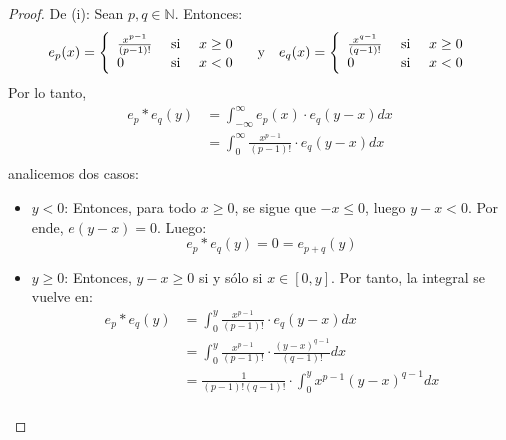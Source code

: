 \documentclass[12pt]{report}
\theoremstyle{largebreak}
\begin{document}
    \begin{proof}
        De (i): Sean $p,q\in\mathbb{N}$. Entonces:
        \begin{equation*}
            e_p(x)=\left\{
                    \begin{array}{lcr}
                        \frac{x^{p-1}}{(p-1)!} & \textup{ si } & x\geq 0 \\
                        0 & \textup{ si }&x<0\\
                    \end{array}
                \right.
            \quad\textup{y}\quad
            e_q(x)=\left\{
                    \begin{array}{lcr}
                        \frac{x^{q-1}}{(q-1)!} & \textup{ si } & x\geq 0 \\
                        0 & \textup{ si }&x<0\\
                    \end{array}
                \right.
        \end{equation*}
        Por lo tanto,
        \begin{equation*}
            \begin{split}
                e_p*e_q(y)&=\int_{-\infty}^\infty e_p(x)\cdot e_q(y-x)dx\\
                &=\int_{0}^\infty\frac{x^{p-1}}{(p-1)!}\cdot e_q(y-x)dx\\ 
            \end{split}
        \end{equation*}
        analicemos dos casos:
        \begin{itemize}
            \item $y<0$: Entonces, para todo $x\geq 0$, se sigue que $-x\leq 0$, luego $y-x<0$. Por ende, $e(y-x)=0$. Luego:
            \begin{equation*}
                e_p*e_q(y)=0=e_{p+q}(y)
            \end{equation*}
            \item $y\geq 0$: Entonces, $y-x\geq 0$ si y sólo si $x\in[0,y]$. Por tanto, la integral se vuelve en:
            \begin{equation*}
                \begin{split}
                    e_p*e_q(y)&=\int_{0}^y\frac{x^{p-1}}{(p-1)!}\cdot e_q(y-x)dx\\
                    &=\int_{0}^y\frac{x^{p-1}}{(p-1)!}\cdot\frac{(y-x)^{q-1}}{(q-1)!}dx\\
                    &=\frac{1}{(p-1)!(q-1)!}\cdot\int_{0}^y x^{p-1}(y-x)^{q-1}dx\\

\end{split}
\end{equation*}
\end{itemize}
\end{proof}
\end{document}
